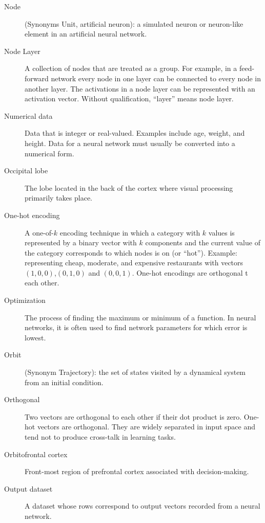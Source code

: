 \begin{description}
\item[Node] (Synonyms Unit, artificial neuron): a simulated neuron or neuron-like element in an artificial neural network. 

\item[Node Layer] A collection of nodes that are treated as a group. For example, in a feed-forward network every node in one layer can be connected to every node in another layer. The activations in a node layer can be represented with an activation vector. Without qualification, ``layer'' means node layer.

\item[Numerical data] Data that is integer or real-valued. Examples include age, weight, and height. Data for a neural network must usually be converted into a numerical form.

\item[Occipital lobe] The lobe located in the back of the cortex where visual processing primarily takes place. 

\item[One-hot encoding] A one-of-$k$ encoding technique in which  a category with $k$ values is represented by a binary vector with $k$ components and the current value of the category corresponds to which nodes is on (or ``hot''). Example: representing cheap, moderate, and expensive restaurants with vectors $(1,0,0)$,$(0,1,0)$ and $(0,0,1)$. One-hot encodings are orthogonal t each other.

\item[Optimization] The process of finding the maximum or minimum of a function. In neural networks, it is often used to find network parameters for which error is lowest.

\item[Orbit] (Synonym Trajectory): the set of states visited by a dynamical system from an initial condition. 

\item[Orthogonal] Two vectors are orthogonal to each other if their dot product is zero. One-hot vectors are orthogonal. They are widely separated in input space and tend not to produce cross-talk in learning tasks.

\item[Orbitofrontal cortex] Front-most region of prefrontal cortex associated with decision-making.

\item[Output dataset] A dataset whose rows correspond to output vectors recorded from a neural network. 


\end{description}
